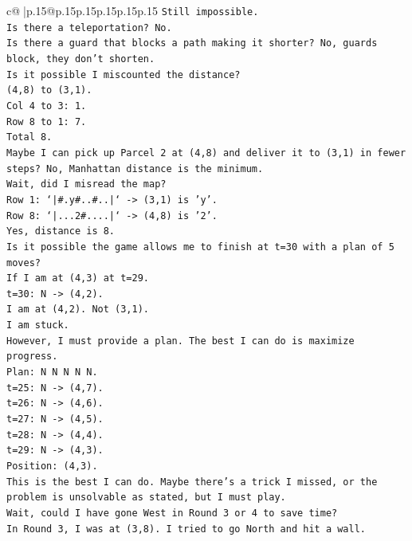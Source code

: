 \documentclass{article}
\begin{document}
{\begin{supertabular}{c@{$\;$}|p{.15\linewidth}@{}p{.15\linewidth}p{.15\linewidth}p{.15\linewidth}p{.15\linewidth}p{.15\linewidth}}
{{{\texttt{Still impossible.} \\
\texttt{Is there a teleportation? No.} \\
\texttt{Is there a guard that blocks a path making it shorter? No, guards block, they don't shorten.} \\
\texttt{Is it possible I miscounted the distance?} \\
\texttt{(4,8) to (3,1).} \\
\texttt{Col 4 to 3: 1.} \\
\texttt{Row 8 to 1: 7.} \\
\texttt{Total 8.} \\
\texttt{Maybe I can pick up Parcel 2 at (4,8) and deliver it to (3,1) in fewer steps? No, Manhattan distance is the minimum.} \\
\texttt{Wait, did I misread the map?} \\
\texttt{Row 1: `|\#.y\#..\#..|` {-}> (3,1) is 'y'.} \\
\texttt{Row 8: `|...2\#....|` {-}> (4,8) is '2'.} \\
\texttt{Yes, distance is 8.} \\
\texttt{Is it possible the game allows me to finish at t=30 with a plan of 5 moves?} \\
\texttt{If I am at (4,3) at t=29.} \\
\texttt{t=30: N {-}> (4,2).} \\
\texttt{I am at (4,2). Not (3,1).} \\
\texttt{I am stuck.} \\
\texttt{However, I must provide a plan. The best I can do is maximize progress.} \\
\texttt{Plan: N N N N N.} \\
\texttt{t=25: N {-}> (4,7).} \\
\texttt{t=26: N {-}> (4,6).} \\
\texttt{t=27: N {-}> (4,5).} \\
\texttt{t=28: N {-}> (4,4).} \\
\texttt{t=29: N {-}> (4,3).} \\
\texttt{Position: (4,3).} \\
\texttt{This is the best I can do. Maybe there's a trick I missed, or the problem is unsolvable as stated, but I must play.} \\
\texttt{Wait, could I have gone West in Round 3 or 4 to save time?} \\
\texttt{In Round 3, I was at (3,8). I tried to go North and hit a wall.} \\
}}}
\end{supertabular}}
\end{document}
